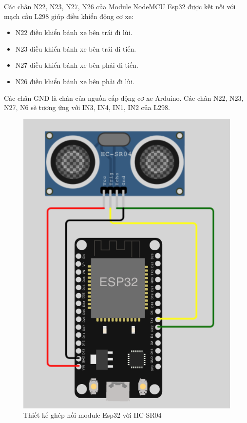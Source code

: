 \documentclass[../DoAn.tex]{subfiles}
\begin{document}
Các chân N22, N23, N27, N26 của Module NodeMCU Esp32 được kết nối với mạch cầu L298 giúp điều khiển động cơ xe:
\begin{itemize}
    \item N22 điều khiển bánh xe bên trái đi lùi.
    \item N23 điều khiển bánh xe bên trái đi tiến.
    \item N27 điều khiển bánh xe bên phải đi tiến.
    \item N26 điều khiển bánh xe bên phải đi lùi.
\end{itemize}

Các chân GND là chân của nguồn cấp động cơ xe Arduino. Các chân N22, N23, N27, N6 sẽ tương ứng với IN3, IN4, IN1, IN2 của L298.

\begin{figure}[H]
    \centering
    \includegraphics[scale = 0.75]{Hinhve/srhc04-esp32.png}
    \caption{Thiết kế ghép nối module Esp32 với HC-SR04}
    \label{fig:Fig8}
\end{figure}
\end{document}
